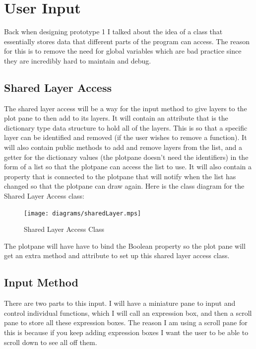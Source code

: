 \documentclass[../../../../main.tex]{subfiles}
\begin{document}
\section{User Input}
Back when designing prototype 1 I talked about the idea of a class that essentially stores data that different parts of the program can access. The reason for this is to remove the need for global variables which are bad practice since they are incredibly hard to maintain and debug.
\subsection{Shared Layer Access}
The shared layer access will be a way for the input method to give layers to the plot pane to then add to its layers. It will contain an attribute that is the dictionary type data structure to hold all of the layers. This is so that a specific layer can be identified and removed (if the user wishes to remove a function). It will also contain public methods to add and remove layers from the list, and a getter for the dictionary values (the plotpane doesn't need the identifiers) in the form of a list so that the plotpane can access the list to use. It will also contain a property that is connected to the plotpane that will notify when the list has changed so that the plotpane can draw again. Here is the class diagram for the Shared Layer Access class:
\begin{figure}[H]
	\centering
	\texttt{[image: diagrams/sharedLayer.mps]}
	\caption{Shared Layer Access Class}
\end{figure}
The plotpane will have have to bind the Boolean property so the plot pane will get an extra method and attribute to set up this shared layer access class.
\newpage
\subsection{Input Method}
There are two parts to this input. I will have a miniature pane to input and control individual functions, which I will call an expression box, and then a scroll pane to store all these expression boxes. The reason I am using a scroll pane for this is because if you keep adding expression boxes I want the user to be able to scroll down to see all off them.
\end{document}
